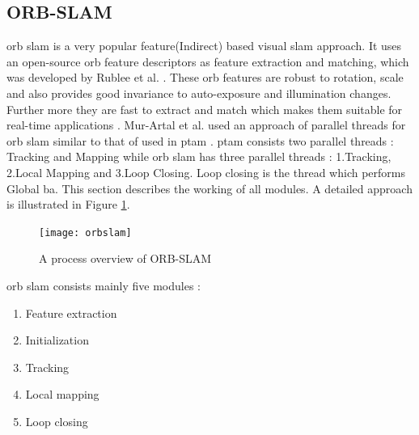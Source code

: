 \subsection{ORB-SLAM}
\acrshort{orb} \acrshort{slam} is a very popular feature(Indirect) based visual \acrshort{slam} approach. It uses an open-source \acrshort{orb} feature descriptors as feature extraction and matching, which was developed by Rublee et al. \cite{ORB}. These \acrshort{orb} features are robust to rotation, scale and also provides good invariance to auto-exposure and illumination changes. Further more they are fast to extract and match which makes them suitable for real-time applications \cite{Mur-Artal}. Mur-Artal et al. \cite{Mur-Artal} used an approach of parallel threads for \acrshort{orb} \acrshort{slam} similar to that of used in \acrshort{ptam} \cite{4538852}. \acrshort{ptam} consists two parallel threads : Tracking and Mapping while \acrshort{orb} \acrshort{slam} has three parallel threads : 1.Tracking, 2.Local Mapping and 3.Loop Closing. Loop closing is the thread which performs Global \acrshort{ba}. This section describes the working of all modules. A detailed approach is illustrated in Figure \ref{fig:orbslam}.
\begin{figure}[H]
	\centering
	\texttt{[image: orbslam]}
	\caption{A process overview of ORB-SLAM \cite{Mur-Artal}}
	\label{fig:orbslam}
\end{figure}

\acrshort{orb} \acrshort{slam} consists mainly five modules :
\begin{enumerate}
	\item Feature extraction 
	\item Initialization
	\item Tracking
	\item Local mapping
	\item Loop closing
\end{enumerate}	

